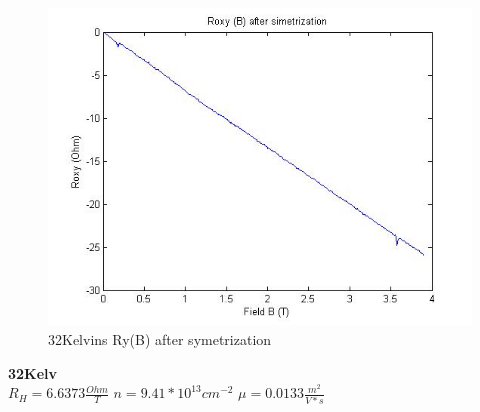 \documentclass[idxtotoc,hyperref,openany,oneside]{labbook} %
\begin{document}
\begin{figure}[H] %
\begin{center}
\includegraphics[width=1\linewidth]{74632kRoxy.jpg}
\end{center}
\caption{32Kelvins Ry(B)  after symetrization} 
\label{fig:fig13}
\end{figure}
\normalsize \textbf{32Kelv}\\
$R_H=6.6373 \frac{Ohm}{T}$
\newline
$n=9.41*10^{13} cm^{-2}$
\newline
$\mu=0.0133 \frac{m^2}{V*s}$
\newline
\end{document}
